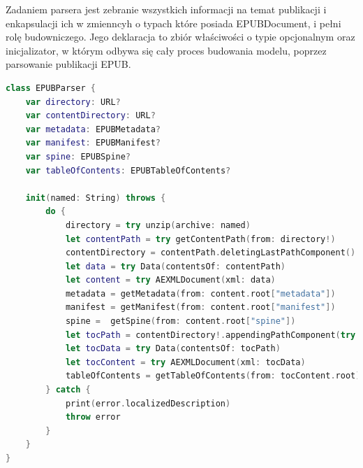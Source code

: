 Zadaniem parsera jest zebranie wszystkich informacji na temat publikacji i enkapsulacji ich w zmienncyh o typach które posiada EPUBDocument, i pełni rolę budowniczego. Jego deklaracja to zbiór właściwości o typie opcjonalnym oraz inicjalizator, w którym odbywa się cały proces budowania modelu, poprzez parsowanie publikacji EPUB.

\begin{lstlisting}[caption={Klasa EPUBParser.}, language=swift]
class EPUBParser {
    var directory: URL?
    var contentDirectory: URL?
    var metadata: EPUBMetadata?
    var manifest: EPUBManifest?
    var spine: EPUBSpine?
    var tableOfContents: EPUBTableOfContents?

    init(named: String) throws {
        do {
            directory = try unzip(archive: named)
            let contentPath = try getContentPath(from: directory!)
            contentDirectory = contentPath.deletingLastPathComponent()
            let data = try Data(contentsOf: contentPath)
            let content = try AEXMLDocument(xml: data)
            metadata = getMetadata(from: content.root["metadata"])
            manifest = getManifest(from: content.root["manifest"])
            spine =  getSpine(from: content.root["spine"])
            let tocPath = contentDirectory!.appendingPathComponent(try manifest!.path(forItemWithId: spine?.toc ?? ""))
            let tocData = try Data(contentsOf: tocPath)
            let tocContent = try AEXMLDocument(xml: tocData)
            tableOfContents = getTableOfContents(from: tocContent.root)
        } catch {
            print(error.localizedDescription)
            throw error
        }
    }
}
\end{lstlisting}

